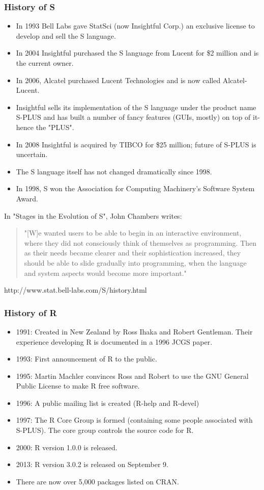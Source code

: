 \documentclass{beamer}\usepackage[]{graphicx}\usepackage[]{color}
\begin{document}
\begin{frame}[c]
	\frametitle{History of S}
	\begin{itemize}
	\item In 1993 Bell Labs gave StatSci (now Insightful Corp.) an exclusive license to develop and sell the S language.
	\item In 2004 Insightful purchased the S language from Lucent for \$2 million and is the current owner.
	\item In 2006, Alcatel purchased Lucent Technologies and is now called Alcatel-Lucent.
	\item Insightful sells its implementation of the S language under the product name S-PLUS and has built a number of fancy features (GUIs, mostly) on top of it-hence the "PLUS".
	\item In 2008 Insightful is acquired by TIBCO for \$25 million; future of S-PLUS is uncertain.
	\item The S language itself has not changed dramatically since 1998.
	\item In 1998, S won the Association for Computing Machinery's Software System Award.
	\end{itemize}
\end{frame}

\begin{frame}[c]
In "Stages in the Evolution of S", John Chambers writes:
\begin{quote}
"[W]e wanted users to be able to begin in an interactive environment, where they did not consciously think of themselves as programming. Then as their needs became clearer and their sophistication increased, they should be able to slide gradually into programming, when the language and system aspects would become more important."
\end{quote}
http://www.stat.bell-labs.com/S/history.html
\end{frame}

\begin{frame}[c]
	\frametitle{History of R}
	\begin{itemize}
	\item 1991: Created in New Zealand by Ross Ihaka and Robert Gentleman. Their experience developing R is documented in a 1996 JCGS paper.
	\item 1993: First announcement of R to the public.
	\item 1995: Martin Machler convinces Ross and Robert to use the GNU General Public License to make R free software.
	\item 1996: A public mailing list is created (R-help and R-devel)
	\item 1997: The R Core Group is formed (containing some people associated with S-PLUS). The core group controls the source code for R.
	\item 2000: R version 1.0.0 is released.
	\item 2013: R version 3.0.2 is released on September 9.
	\item There are now over 5,000 packages listed on CRAN. 
	\end{itemize}
\end{frame}
\end{document}
